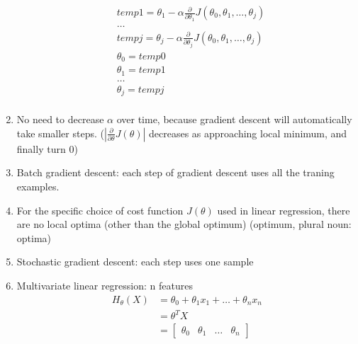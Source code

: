 \documentclass[UTF8]{ctexart}
\begin{document}
\begin{enumerate}
\[\begin{aligned}
                   & temp1 = \theta_1 - \alpha \frac{\partial}{\partial\theta_1} J(\theta_0, \theta_1, \ldots, \theta_j) \\
                   & \ldots                                                                                              \\
                   & tempj = \theta_j - \alpha \frac{\partial}{\partial\theta_j} J(\theta_0, \theta_1, \ldots, \theta_j) \\
                   & \theta_0 = temp0                                                                                    \\
                   & \theta_1 = temp1                                                                                    \\
                   & \ldots                                                                                              \\
                   & \theta_j = tempj                                                                                    \\
              \end{aligned}
          \]
    \item No need to decrease $\alpha$ over time, because gradient descent will automatically take smaller steps. ($|\frac{\partial}{\partial\theta}J(\theta)|$ decreases as approaching local minimum, and finally turn $0$)
    \item Batch gradient descent: each step of gradient descent uses all the traning examples.
    \item For the specific choice of cost function $J(\theta)$ used in linear regression, there are no local optima (other than the global optimum) (optimum, plural noun: optima)
    \item Stochastic gradient descent: each step uses one sample
    \item Multivariate linear regression: n features
          \[
              \begin{aligned}
                  H_\theta(X) & = \theta_0 + \theta_1 x_1 + \ldots + \theta_n x_n \\
                              & = \theta^{T}X                                     \\
                              & =
                  \begin{bmatrix}
                      \theta_0 & \theta_1 & \ldots & \theta_n
                  \end{bmatrix}

\end{aligned}\]
\end{enumerate}
\end{document}
